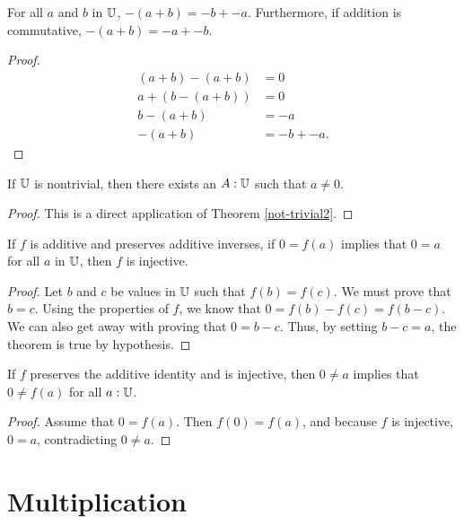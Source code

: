 \documentclass[../math.tex]{subfiles}
\begin{document}
\begin{theorem} \label{neg-plus}
    For all $a$ and $b$ in $\mathbb{U}$, $-(a + b) = -b + -a$.  Furthermore, if addition
    is commutative, $-(a + b) = -a + -b$.
\end{theorem}
\begin{proof}
    \begin{align*}
        (a + b) - (a + b) &= 0 \\
        a + (b - (a + b)) &= 0 \\
        b - (a + b) &= -a \\
        -(a + b) &= -b + -a.
    \end{align*}
\end{proof}

\begin{theorem} \label{not-trivial-zero}
    If $\mathbb{U}$ is nontrivial, then there exists an $A : \mathbb{U}$ such that $a \neq 0$.
\end{theorem}
\begin{proof}
    This is a direct application of Theorem \ref{not-trivial2}.
\end{proof}

\begin{theorem} \label{homo-zero-inj}
    If $f$ is additive and preserves additive inverses, if $0 = f(a)$ implies
    that $0 = a$ for all $a$ in $\mathbb{U}$, then $f$ is injective.
\end{theorem}
\begin{proof}
    Let $b$ and $c$ be values in $\mathbb{U}$ such that $f(b) = f(c)$.  We must prove
    that $b = c$.  Using the properties of $f$, we know that $0 = f(b) - f(c) =
    f(b - c)$.  We can also get away with proving that $0 = b - c$.  Thus, by
    setting $b - c = a$, the theorem is true by hypothesis.
\end{proof}

\begin{theorem} \label{homo-inj-zero}
    If $f$ preserves the additive identity and is injective, then $0 \neq a$
    implies that $0 \neq f(a)$ for all $a : \mathbb{U}$.
\end{theorem}
\begin{proof}
    Assume that $0 = f(a)$.  Then $f(0) = f(a)$, and because $f$ is injective,
    $0 = a$, contradicting $0 \neq a$.
\end{proof}

\section{Multiplication}
\end{document}
